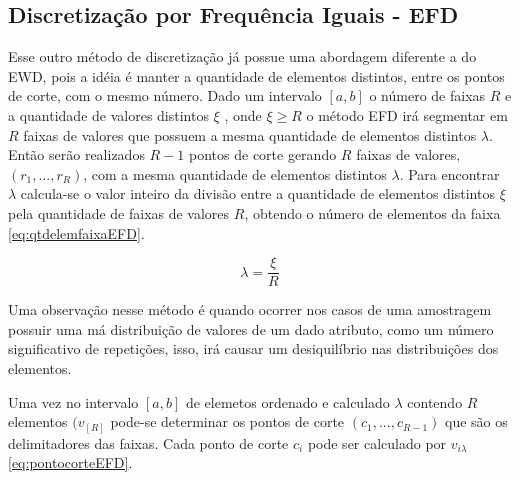 


\subsection{Discretização por Frequência Iguais - EFD}\label{cap:refTeor:subsec:efd}

Esse outro método de discretização já possue uma abordagem diferente a do EWD, pois a idéia é manter a quantidade de elementos distintos, entre os pontos de corte, com o mesmo número. Dado um intervalo ${[a,b]}$ o número de faixas ${R}$ e a quantidade de valores distintos ${\xi}$ , onde ${\xi \geqslant R}$ o método EFD irá segmentar em  ${R}$ faixas de valores que possuem a mesma quantidade de elementos distintos ${\lambda}$. Então serão realizados ${R-1}$ pontos de corte gerando ${R}$ faixas de valores, ${(r_1,...,r_R)}$, com a mesma quantidade de elementos distintos ${\lambda}$. Para encontrar ${\lambda}$ calcula-se o valor inteiro da divisão entre a quantidade de elementos distintos ${\xi}$ pela quantidade de faixas de valores ${R}$, obtendo o número de elementos da faixa \ref{eq:qtdelemfaixaEFD}.

\begin{equation}
\lambda = \frac{\xi}{R}
 \label{eq:qtdelemfaixaEFD}
\end{equation}

Uma observação nesse método é quando ocorrer nos casos de uma amostragem possuir uma má distribuição de valores de um dado atributo, como um número significativo de repetições, isso, irá causar um desiquilíbrio nas distribuições dos elementos.

Uma vez no intervalo ${[a,b]}$ de elemetos ordenado e calculado ${\lambda}$ contendo ${R}$ elementos ${(v_{[R]}}$  pode-se determinar os pontos de corte ${(c_1,...,c_{R-1})}$ que são os delimitadores das faixas. Cada ponto de corte ${c_i}$ pode ser calculado por ${v_{i\lambda}}$ \ref{eq:pontocorteEFD}.

